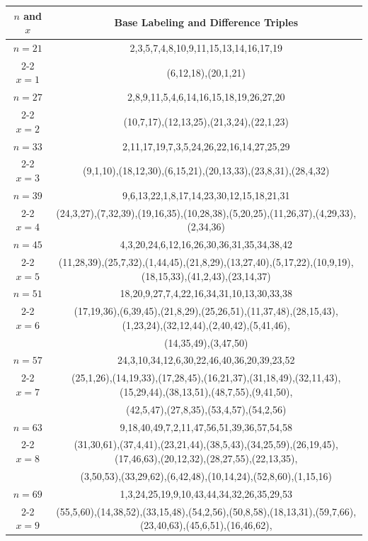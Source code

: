 \begin{tabular}{| c | c |}
\hline
\(n\) and \(x\) & Base Labeling and Difference Triples\\
\hline
\(n=21\) & 
2,3,5,7,4,8,10,9,11,15,13,14,16,17,19\\
\cline{2-2}
\(x=1\)
&(6,12,18),(20,1,21)\\
\hline 
\(n=27\) & 
2,8,9,11,5,4,6,14,16,15,18,19,26,27,20\\
\cline{2-2}
\(x=2\)
&(10,7,17),(12,13,25),(21,3,24),(22,1,23)\\
\hline 
\(n=33\) & 
2,11,17,19,7,3,5,24,26,22,16,14,27,25,29\\
\cline{2-2}
\(x=3\)
&(9,1,10),(18,12,30),(6,15,21),(20,13,33),(23,8,31),(28,4,32)\\
\hline 
\(n=39\) & 
9,6,13,22,1,8,17,14,23,30,12,15,18,21,31\\
\cline{2-2}
\(x=4\)
&(24,3,27),(7,32,39),(19,16,35),(10,28,38),(5,20,25),(11,26,37),(4,29,33),(2,34,36)\\
\hline 
\(n=45\) & 
4,3,20,24,6,12,16,26,30,36,31,35,34,38,42\\
\cline{2-2}
\(x=5\)
&(11,28,39),(25,7,32),(1,44,45),(21,8,29),(13,27,40),(5,17,22),(10,9,19),(18,15,33),(41,2,43),(23,14,37)\\
\hline 
\(n=51\) & 
18,20,9,27,7,4,22,16,34,31,10,13,30,33,38\\
\cline{2-2}
\(x=6\)
&(17,19,36),(6,39,45),(21,8,29),(25,26,51),(11,37,48),(28,15,43),(1,23,24),(32,12,44),(2,40,42),(5,41,46),\\
&(14,35,49),(3,47,50)\\
\hline 
\(n=57\) & 
24,3,10,34,12,6,30,22,46,40,36,20,39,23,52\\
\cline{2-2}
\(x=7\)
&(25,1,26),(14,19,33),(17,28,45),(16,21,37),(31,18,49),(32,11,43),(15,29,44),(38,13,51),(48,7,55),(9,41,50),\\
&(42,5,47),(27,8,35),(53,4,57),(54,2,56)\\
\hline 
\(n=63\) & 
9,18,40,49,7,2,11,47,56,51,39,36,57,54,58\\
\cline{2-2}
\(x=8\)
&(31,30,61),(37,4,41),(23,21,44),(38,5,43),(34,25,59),(26,19,45),(17,46,63),(20,12,32),(28,27,55),(22,13,35),\\
&(3,50,53),(33,29,62),(6,42,48),(10,14,24),(52,8,60),(1,15,16)\\
\hline 
\(n=69\) & 
1,3,24,25,19,9,10,43,44,34,32,26,35,29,53\\
\cline{2-2}
\(x=9\)
&(55,5,60),(14,38,52),(33,15,48),(54,2,56),(50,8,58),(18,13,31),(59,7,66),(23,40,63),(45,6,51),(16,46,62),\\

\end{tabular}
